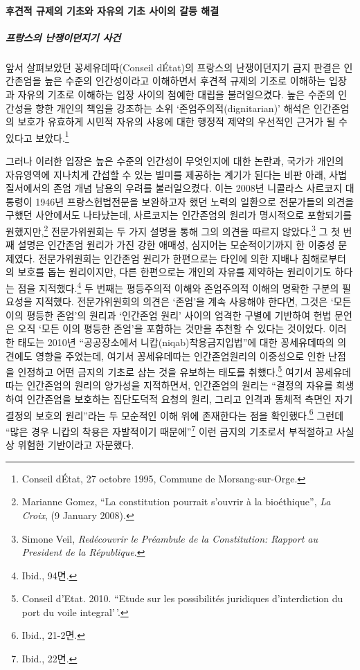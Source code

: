 \paragraph{후견적 규제의 기초와 자유의 기초 사이의 갈등 해결}

\subparagraph{프랑스의 난쟁이던지기 사건}

앞서 살펴보았던 꽁세유데따(Conseil d\textquotesingle État)의 프랑스의 난쟁이던지기 금지 판결은 인간존엄을 높은 수준의 인간성이라고 이해하면서 후견적 규제의 기초로 이해하는 입장과 자유의 기초로 이해하는 입장 사이의 첨예한 대립을 불러일으켰다. 높은 수준의 인간성을 향한 개인의 책임을 강조하는 소위 `존엄주의적(dignitarian)' 해석은 인간존엄의 보호가 유효하게 시민적 자유의 사용에 대한 행정적 제약의 우선적인 근거가 될 수 있다고 보았다.\footnote{Conseil d\textquotesingle État, 27 octobre 1995, Commune de Morsang-sur-Orge.}

그러나 이러한 입장은 높은 수준의 인간성이 무엇인지에 대한 논란과, 국가가 개인의 자유영역에 지나치게 간섭할 수 있는 빌미를 제공하는 계기가 된다는 비판 아래, 사법질서에서의 존엄 개념 남용의 우려를 불러일으켰다. 이는 2008년 니콜라스 사르코지 대통령이 1946년 프랑스헌법전문을 보완하고자 했던 노력의 일환으로 전문가들의 의견을 구했던 사안에서도 나타났는데, 사르코지는 인간존엄의 원리가 명시적으로 포함되기를 원했지만,\footnote{Marianne Gomez, ``La constitution pourrait s'ouvrir à la bioéthique'', \emph{La Croix}, (9 January 2008).} 전문가위원회는 두 가지 설명을 통해 그의 의견을 따르지 않았다.\footnote{Simone Veil, \emph{Redécouvrir le Préambule de la Constitution: Rapport au President de la République}.} 그 첫 번째 설명은 인간존엄 원리가 가진 강한 애매성, 심지어는 모순적이기까지 한 이중성 문제였다. 전문가위원회는 인간존엄 원리가 한편으로는 타인에 의한 지배나 침해로부터의 보호를 돕는 원리이지만, 다른 한편으로는 개인의 자유를 제약하는 원리이기도 하다는 점을 지적했다.\footnote{Ibid., 94면.} 두 번째는 평등주의적 이해와 존엄주의적 이해의 명확한 구분의 필요성을 지적했다. 전문가위원회의 의견은 `존엄'을 계속 사용해야 한다면, 그것은 `모든 이의 평등한 존엄'의 원리과 `인간존엄 원리' 사이의 엄격한 구별에 기반하여 헌법 문언은 오직 `모든 이의 평등한 존엄'을 포함하는 것만을 추천할 수 있다는 것이었다. 이러한 태도는 2010년 ``공공장소에서 니캅(niqab)착용금지입법''에 대한 꽁세유데따의 의견에도 영향을 주었는데, 여기서 꽁세유데따는 인간존엄원리의 이중성으로 인한 난점을 인정하고 어떤 금지의 기초로 삼는 것을 유보하는 태도를 취했다.\footnote{Conseil d'Etat. 2010. ``Etude sur les possibilités juridiques d'interdiction du port du voile integral'\,'.} 여기서 꽁세유데따는 인간존엄의 원리의 양가성을 지적하면서, 인간존엄의 원리는 ``결정의 자유를 희생하여 인간존엄을 보호하는 집단도덕적 요청의 원리, 그리고 인격과 동체적 측면인 자기결정의 보호의 원리''라는 두 모순적인 이해 위에 존재한다는 점을 확인했다.\footnote{Ibid., 21-2면.} 그런데 ``많은 경우 니캅의 착용은 자발적이기 때문에''\footnote{Ibid., 22면.} 이런 금지의 기초로서 부적절하고 사실상 위험한 기반이라고 자문했다.

